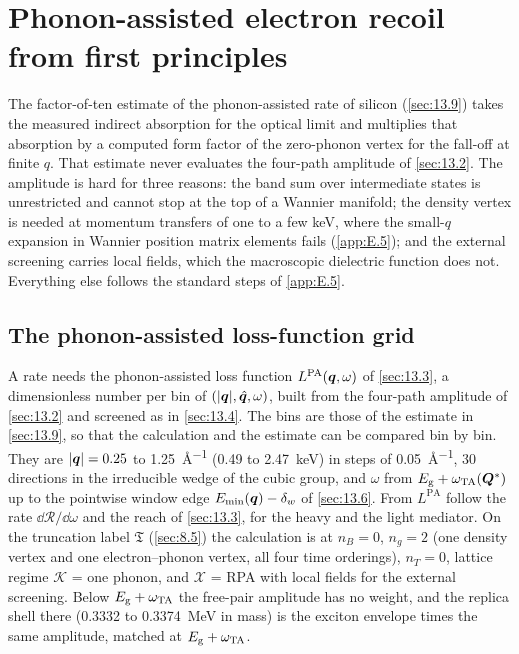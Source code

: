 \section{Phonon-assisted electron recoil from first principles}\label{app:E.14}

The factor-of-ten estimate of the phonon-assisted rate of silicon (\cref{sec:13.9}) takes the measured indirect absorption for the optical limit and multiplies that absorption by a computed form factor of the zero-phonon vertex for the fall-off at finite $q$. That estimate never evaluates the four-path amplitude of \cref{sec:13.2}. The amplitude is hard for three reasons: the band sum over intermediate states is unrestricted and cannot stop at the top of a Wannier manifold; the density vertex is needed at momentum transfers of one to a few keV, where the small-$q$ expansion in Wannier position matrix elements fails (\cref{app:E.5}); and the external screening carries local fields, which the macroscopic dielectric function does not. Everything else follows the standard steps of \cref{app:E.5}.

\subsection{The phonon-assisted loss-function grid}

A rate needs the phonon-assisted loss function $L^{\mathrm{PA}}(\bm{q},\omega)$ of \cref{sec:13.3}, a dimensionless number per bin of $(|\bm{q}|,\hat{\bm{q}},\omega)$, built from the four-path amplitude of \cref{sec:13.2} and screened as in \cref{sec:13.4}. The bins are those of the estimate in \cref{sec:13.9}, so that the calculation and the estimate can be compared bin by bin. They are $|\bm{q}| = 0.25$ to \SI{1.25}{\angstrom^{-1}} (0.49 to \SI{2.47}{keV}) in steps of \SI{0.05}{\angstrom^{-1}}, 30 directions in the irreducible wedge of the cubic group, and $\omega$ from $E_{\mathrm{g}} + \omega_{\mathrm{TA}}(\bm{Q}^*)$ up to the pointwise window edge $E_{\mathrm{min}}(\bm{q}) - \delta_w$ of \cref{sec:13.6}. From $L^{\mathrm{PA}}$ follow the rate $\dd\mathcal{R}/\dd\omega$ and the reach of \cref{sec:13.3}, for the heavy and the light mediator. On the truncation label $\mathfrak{T}$ (\cref{sec:8.5}) the calculation is at $n_B = 0$, $n_g = 2$ (one density vertex and one electron--phonon vertex, all four time orderings), $n_T = 0$, lattice regime $\mathcal{K}$ = one phonon, and $\mathcal{X}$ = RPA with local fields for the external screening. Below $E_{\mathrm{g}} + \omega_{\mathrm{TA}}$ the free-pair amplitude has no weight, and the replica shell there (0.3332 to \SI{0.3374}{MeV} in mass) is the exciton envelope times the same amplitude, matched at $E_{\mathrm{g}} + \omega_{\mathrm{TA}}$.

